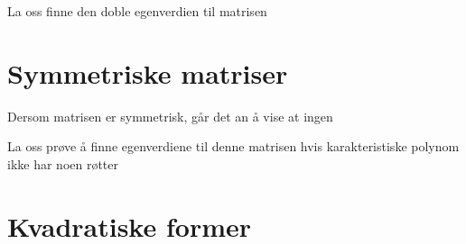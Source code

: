 \begin{ex}
La oss finne den doble egenverdien til matrisen
\end{ex}



\section*{Symmetriske matriser}
Dersom matrisen er symmetrisk, går det an å vise at ingen 
\begin{ex}
La oss prøve å finne egenverdiene til denne matrisen hvis karakteristiske polynom ikke har noen røtter
\end{ex}

\section*{Kvadratiske former}

\kapittelslutt
